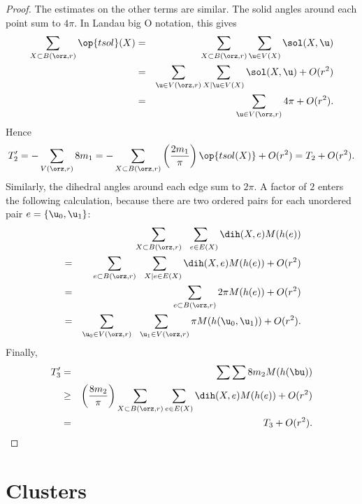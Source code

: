 \begin{proof}
The estimates on the other terms are similar.  The solid angles
around each point sum to $4\pi$.
In Landau big O notation, this gives
\begin{eqnarray*} 
\sum_{X\subset B(\orz,r)} \op{tsol}(X) &=& 
\sum_{X\subset B(\orz,r)} \sum_{ \u\in V(X)} \sol(X, \u)\\
&=&\sum_{ \u\in  V(\orz,r)} \sum_{X\mid  \u\in V(X)} \sol(X, \u) + O(r^2)\\
&=&\sum_{ \u\in  V(\orz,r)} 4\pi    + O(r^2).
\end{eqnarray*}
Hence
\begin{displaymath} 
T_2' = -\sum_{ V(\orz,r)} 8 m_1 = 
-\sum_{X\subset B(\orz,r)}\left(\frac{2m_1}\pi\right) \op{tsol(X)} + O(r^2) = T_2 + O(r^2).
\end{displaymath}
Similarly, the dihedral angles around each edge sum to $2\pi$.  A
factor of $2$ enters the following calculation, because there are two
ordered pairs for each unordered pair $e=\{ \u_0, \u_1\}$:
\begin{eqnarray*} 
&\phantom{=}&\sum_{X\subset B(\orz,r)} \sum_{~~e\in E(X)} \dih(X,e)  M(h(e)) \vspace{3pt}\\
&=&\sum_{e\subset B(\orz,r)} \sum_{~~X\mid e\in E(X)} \dih(X,e)  M(h(e)) +O(r^2)\vspace{3pt}\\
&=&\sum_{e\subset B(\orz,r)} 2\pi M(h(e)) + O(r^2)\vspace{3pt} \\
&=&\sum_{ \u_0\in  V(\orz,r)} \sum_{~~\u_1\in  V(\orz,r) } \pi M(h( \u_0, \u_1)) + O(r^2).\\
\end{eqnarray*}
Finally,
\begin{eqnarray*} 
T_3' &=& \sum\sum 8 m_2 M(h(\bu)) \\
&\ge& \left(\frac{8m_2}\pi\right)
\sum_{X\subset B(\orz,r)}\sum_{e\in E(X)}\dih(X,e) M(h(e)) + O(r^2) \\
&=& T_3 + O(r^2).
\end{eqnarray*}
\end{proof}




\section{Clusters}

